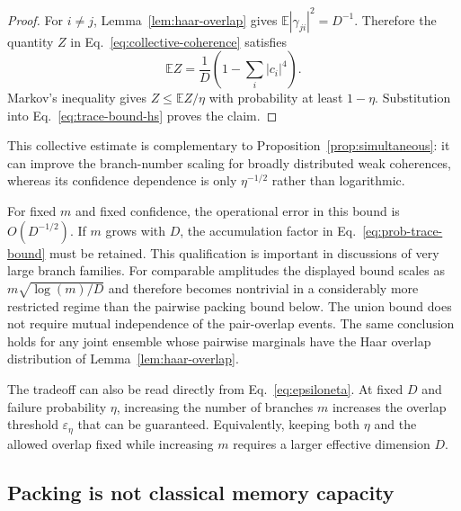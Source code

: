 \documentclass[aps,pra,reprint,superscriptaddress,nofootinbib,longbibliography]{revtex4-2}
\newcommand{\eps}{\varepsilon}
\newcommand{\E}{\mathbb{E}}
\begin{document}
\begin{proof}
For $i\neq j$, Lemma~\ref{lem:haar-overlap} gives
$\E|\gamma_{ji}|^2=D^{-1}$.  Therefore the quantity $Z$ in
Eq.~\eqref{eq:collective-coherence} satisfies
\begin{equation}
 \E Z=\frac{1}{D}\left(1-\sum_i|c_i|^4\right).
\end{equation}
Markov's inequality gives $Z\leq\E Z/\eta$ with probability at least
$1-\eta$.  Substitution into Eq.~\eqref{eq:trace-bound-hs} proves the claim.
\end{proof}

This collective estimate is complementary to Proposition~\ref{prop:simultaneous}:
it can improve the branch-number scaling for broadly distributed weak
coherences, whereas its confidence dependence is only $\eta^{-1/2}$ rather
than logarithmic.

For fixed $m$ and fixed confidence, the operational error in this bound is
$O(D^{-1/2})$.  If $m$ grows with $D$, the accumulation factor in
Eq.~\eqref{eq:prob-trace-bound} must be retained.  This qualification is
important in discussions of very large branch families.  For comparable
amplitudes the displayed bound scales as
$m\sqrt{\log(m)/D}$ and therefore becomes nontrivial in a considerably more
restricted regime than the pairwise packing bound below.  The union bound
does not require mutual independence of the pair-overlap events.  The same
conclusion holds for any joint ensemble whose pairwise marginals have the
Haar overlap distribution of Lemma~\ref{lem:haar-overlap}.

The tradeoff can also be read directly from Eq.~\eqref{eq:epsiloneta}.  At
fixed $D$ and failure probability $\eta$, increasing the number of branches
$m$ increases the overlap threshold $\eps_\eta$ that can be guaranteed.
Equivalently, keeping both $\eta$ and the allowed overlap fixed while
increasing $m$ requires a larger effective dimension $D$.

\subsection{Packing is not classical memory capacity}
\end{document}
